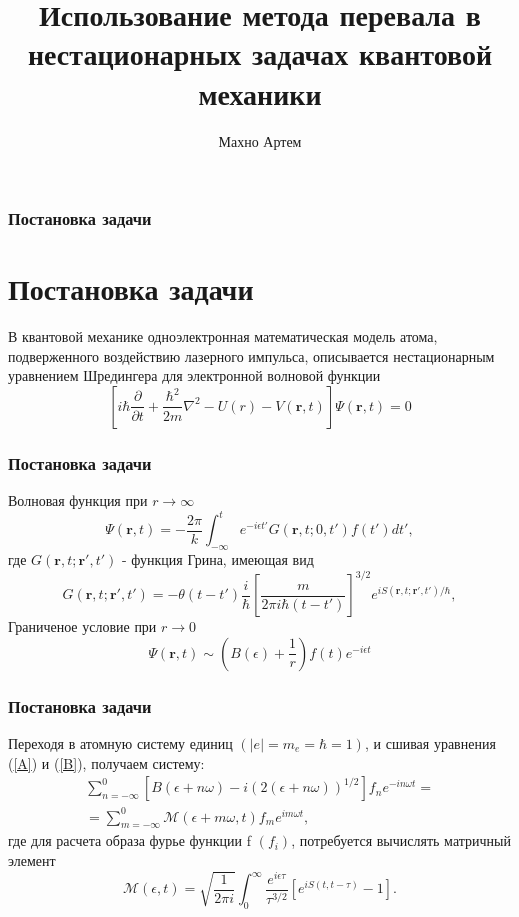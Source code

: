 \documentclass{beamer}
\newcommand{\vr}{\mathbf{r}}
\newcommand{\cM}{\mathcal{M}}
\begin{document}
\title{Использование метода перевала в нестационарных задачах квантовой механики}  
\author{Махно Артем}
\date{}
\frame
{
	\titlepage 
	\small{}
} 




\frame
{
	\frametitle{Постановка задачи}
	\section{Постановка задачи}
	В квантовой механике одноэлектронная математическая модель атома, подверженного воздействию лазерного импульса, описывается нестационарным уравнением Шредингера для электронной волновой функции
	$$
	\left[i\hbar\frac{\partial}{\partial t} + \frac{\hbar^2}{2 m} \nabla^2 - U(r) - V(\vr, t)\right]\Psi(\vr, t) = 0
	$$
}

\frame
{
	\frametitle{Постановка задачи}
	Волновая функция при $r \rightarrow \infty$
	\begin{equation}\label{A}
		\Psi(\vr, t) = -\frac{2\pi}{k} \int_{-\infty}^{t} e^{-i\epsilon t'} G(\vr, t;0, t')f(t')dt',
	\end{equation}
	где $G(\vr, t;\vr', t')$ - функция Грина, имеющая вид
	\begin{equation}\nonumber
	\label{Green}
	G(\vr,t;\vr',t') = -\theta(t-t')\frac{i}{\hbar}\left[\frac{m}{2\pi i\hbar(t-t')}\right]^{3/2}e^{iS(\vr,t;\vr',t')/\hbar},
	\end{equation}
	Граниченое условие при $r \rightarrow 0$
	\begin{equation}\label{B}
	\Psi(\vr, t) \sim \left(B(\epsilon) + \frac{1}{r}\right)f(t)e^{-i\epsilon t}
	\end{equation}
}

\frame
{
	\frametitle{Постановка задачи}
	Переходя в атомную систему единиц $(|e| = m_e = \hbar = 1)$, и сшивая уравнения (\ref{A}) и (\ref{B}), получаем систему:
	\begin{eqnarray}\label{system}
		\sum_{n = -\infty}^{0}[B(\epsilon + n\omega) - i(2(\epsilon + n\omega))^{1/2}]f_ne^{-i n\omega t} = \nonumber\\
		= \sum_{m = -\infty}^{0} \cM(\epsilon + m\omega,t)f_me^{i m \omega t}, 
	\end{eqnarray}
	где для расчета образа фурье функции f $(f_i)$,  
	потребуется вычислять матричный элемент
	\begin{equation}\label{input}
		\cM(\epsilon, t) = \sqrt{\frac{1}{2\pi i}}\int_{0}^{\infty}\frac{e^{i\epsilon\tau}}{\tau^{3/2}}\left[e^{iS(t, t-\tau)} - 1\right].
	\end{equation}
}
\end{document}
